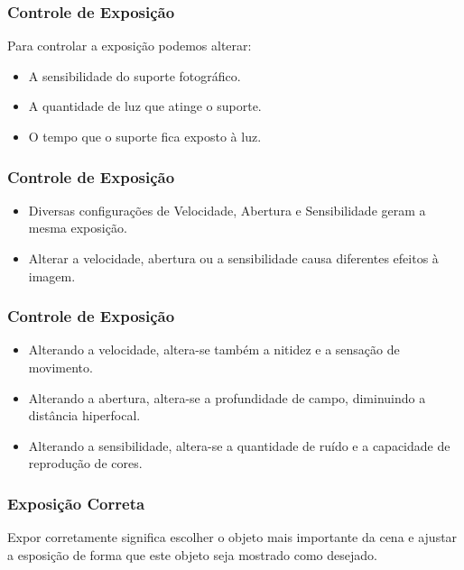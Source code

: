 
\begin{frame}
    \frametitle{Controle de Exposição}
    Para controlar a exposição podemos alterar:
    \begin{itemize}
        \item A sensibilidade do suporte fotográfico.
        \item A quantidade de luz que atinge o suporte.
        \item O tempo que o suporte fica exposto à luz.
    \end{itemize}
\end{frame}


\begin{frame}
    \frametitle{Controle de Exposição}
    \begin{itemize}
        \item Diversas configurações de Velocidade, Abertura e Sensibilidade geram a mesma exposição.
        \item Alterar a velocidade, abertura ou a sensibilidade causa diferentes efeitos à imagem.
    \end{itemize}
\end{frame}

\begin{frame}
    \frametitle{Controle de Exposição}
    \begin{itemize}
        \item Alterando a velocidade, altera-se também a nitidez e a sensação de movimento.
        \item Alterando a abertura, altera-se a profundidade de campo, diminuindo a distância hiperfocal.
        \item Alterando a sensibilidade, altera-se a quantidade de ruído e a capacidade de reprodução de cores.
    \end{itemize}
\end{frame}




\begin{frame}
    \frametitle{Exposição Correta}
    Expor corretamente significa escolher o objeto mais importante da cena e
    ajustar a esposição de forma que este objeto seja mostrado como desejado.
\end{frame}

